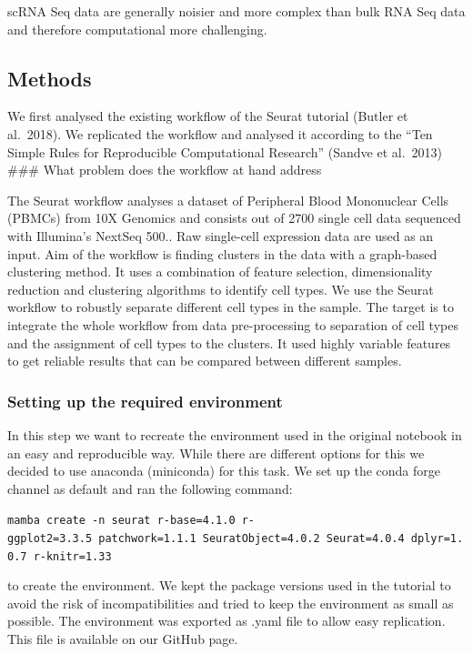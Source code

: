 scRNA Seq data are generally noisier and more complex than bulk RNA Seq
data and therefore computational more challenging.

\hypertarget{methods}{%
\subsection{Methods}\label{methods}}

We first analysed the existing workflow of the Seurat tutorial (Butler
et al.~2018). We replicated the workflow and analysed it according to
the ``Ten Simple Rules for Reproducible Computational Research'' (Sandve
et al.~2013) \#\#\# What problem does the workflow at hand address

The Seurat workflow analyses a dataset of Peripheral Blood Mononuclear
Cells (PBMCs) from 10X Genomics and consists out of 2700 single cell
data sequenced with Illumina's NextSeq 500.. Raw single-cell expression
data are used as an input. Aim of the workflow is finding clusters in
the data with a graph-based clustering method. It uses a combination of
feature selection, dimensionality reduction and clustering algorithms to
identify cell types. We use the Seurat workflow to robustly separate
different cell types in the sample. The target is to integrate the whole
workflow from data pre-processing to separation of cell types and the
assignment of cell types to the clusters. It used highly variable
features to get reliable results that can be compared between different
samples.

\hypertarget{setting-up-the-required-environment}{%
\subsubsection{Setting up the required
environment}\label{setting-up-the-required-environment}}

In this step we want to recreate the environment used in the original
notebook in an easy and reproducible way. While there are different
options for this we decided to use anaconda (miniconda) for this task.
We set up the conda forge channel as default and ran the following
command:

\texttt{mamba\ create\ -n\ seurat\ r-base=4.1.0\ r-ggplot2=3.3.5\ patchwork=1.1.1\ SeuratObject=4.0.2\ Seurat=4.0.4\ dplyr=1.0.7\ r-knitr=1.33}

to create the environment. We kept the package versions used in the
tutorial to avoid the risk of incompatibilities and tried to keep the
environment as small as possible. The environment was exported as .yaml
file to allow easy replication. This file is available on our GitHub
page.

